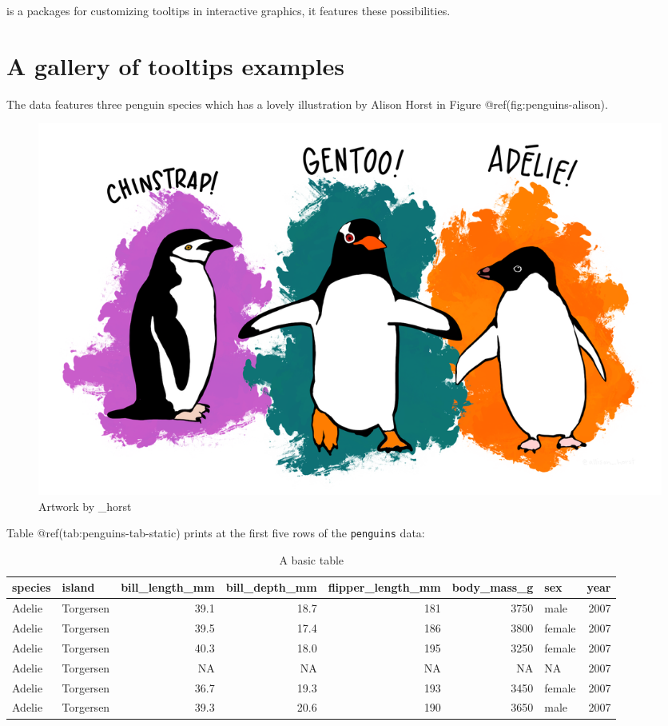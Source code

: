  is a packages for customizing tooltips in interactive
graphics, it features these possibilities.

\hypertarget{a-gallery-of-tooltips-examples}{%
\section{A gallery of tooltips
examples}\label{a-gallery-of-tooltips-examples}}

The  data \citep{palmerpenguins} features three
penguin species which has a lovely illustration by Alison Horst in
Figure @ref(fig:penguins-alison).

\begin{Schunk}
\begin{figure}
\includegraphics[width=1\linewidth,height=0.3\textheight]{penguins} \caption[Artwork by \@allison\_horst]{Artwork by \@allison\_horst}\label{fig:penguins-alison}
\end{figure}
\end{Schunk}

Table @ref(tab:penguins-tab-static) prints at the first five rows of the
\texttt{penguins} data:

\begin{Schunk}
\begin{table}

\caption{\label{tab:penguins-tab-static}A basic table}
\centering
\fontsize{7}{9}\selectfont
\begin{tabular}[t]{l|l|r|r|r|r|l|r}
\hline
species & island & bill\_length\_mm & bill\_depth\_mm & flipper\_length\_mm & body\_mass\_g & sex & year\\
\hline
Adelie & Torgersen & 39.1 & 18.7 & 181 & 3750 & male & 2007\\
\hline
Adelie & Torgersen & 39.5 & 17.4 & 186 & 3800 & female & 2007\\
\hline
Adelie & Torgersen & 40.3 & 18.0 & 195 & 3250 & female & 2007\\
\hline
Adelie & Torgersen & NA & NA & NA & NA & NA & 2007\\
\hline
Adelie & Torgersen & 36.7 & 19.3 & 193 & 3450 & female & 2007\\
\hline
Adelie & Torgersen & 39.3 & 20.6 & 190 & 3650 & male & 2007\\
\hline
\end{tabular}
\end{table}

\end{Schunk}

